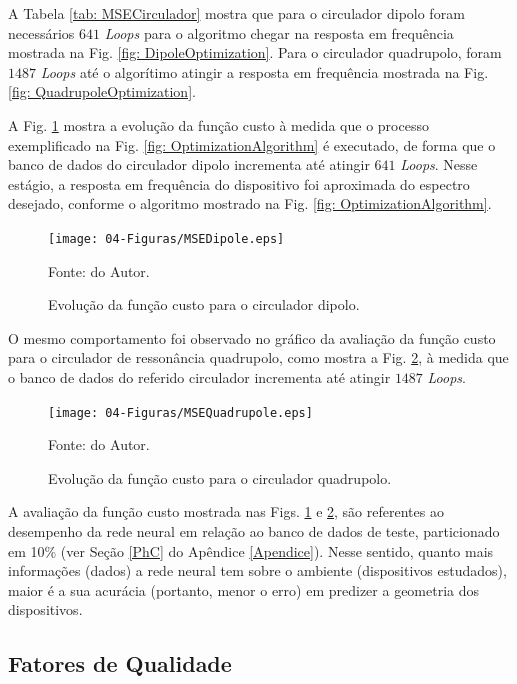A Tabela \ref{tab: MSECirculador} mostra que para o circulador dipolo foram necessários $641$ \textit{Loops} para o algoritmo chegar na resposta em frequência mostrada na Fig. \ref{fig: DipoleOptimization}. Para o circulador quadrupolo, foram $1487$ \textit{Loops} até o algorítimo atingir a resposta em frequência mostrada na Fig. \ref{fig: QuadrupoleOptimization}.



A Fig. \ref{fig: MSEDipole} mostra a evolução da função custo à medida que o processo exemplificado na Fig. \ref{fig: OptimizationAlgorithm} é executado, de forma que o banco de dados do circulador dipolo incrementa até atingir $641$ \textit{Loops}. Nesse estágio, a resposta em frequência do dispositivo foi aproximada do espectro desejado, conforme o algoritmo mostrado na Fig. \ref{fig: OptimizationAlgorithm}.

\begin{figure}[H]
	\centering\texttt{[image: 04-Figuras/MSEDipole.eps]}
	\caption{Evolução da função custo para o circulador dipolo.}
    Fonte: do Autor.
	\label{fig: MSEDipole}
\end{figure}

O mesmo comportamento foi observado no gráfico da avaliação da função custo para o circulador de ressonância quadrupolo, como mostra a Fig. \ref{fig: MSEQuadrupole}, à medida que o banco de dados do referido circulador incrementa até atingir $1487$ \textit{Loops}.

\begin{figure}[H]
	\centering\texttt{[image: 04-Figuras/MSEQuadrupole.eps]}
	\caption{Evolução da função custo para o circulador quadrupolo.}
    Fonte: do Autor.
	\label{fig: MSEQuadrupole}
\end{figure}

A avaliação da função custo mostrada nas Figs. \ref{fig: MSEDipole} e \ref{fig: MSEQuadrupole}, são referentes ao desempenho da rede neural em relação ao banco de dados de teste, particionado em 10\% (ver Seção \ref{PhC} do Apêndice \ref{Apendice}). Nesse sentido, quanto mais informações (dados) a rede neural tem sobre o ambiente (dispositivos estudados), maior é a sua acurácia (portanto, menor o erro) em predizer a geometria dos dispositivos.

\newpage
\subsection{Fatores de Qualidade}

